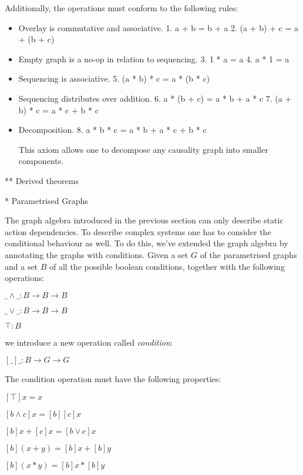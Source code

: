 \documentclass[conference]{IEEEtran}
\begin{document}
Additionally, the operations must conform to the following rules:

\begin{itemize}
\item{Overlay is commutative and associative.
1. a + b = b + a
2. (a + b) + c = a + (b + c)
}

\item{Empty graph is a no-op in relation to sequencing.
3. 1 * a = a
4. a * 1 = a}

\item{Sequencing is associative.
5. (a * b) * c = a * (b * c)}

\item{Sequencing distributes over addition.
6. a * (b + c) = a * b + a * c
7. (a + b) * c = a * c + b * c}

\item{Decomposition.
8. a * b * c = a * b + a * c + b * c

This axiom allows one to decompose any causality graph into smaller components.}

\end{itemize}

** Derived theorems


* Parametrised Graphs

The graph algebra introduced in the previous section can only describe static action dependencies.
To describe complex systems one has to consider the conditional behaviour as well.
To do this, we've extended the graph algebra by annotating the graphs with conditions.
Given a set $G$ of the parametrised graphs and a set $B$ of all the possible boolean conditions, together with the following operations:

$\_\wedge\_ : B \rightarrow B \rightarrow B$

$\_\vee\_ : B \rightarrow B \rightarrow B$

$\top : B$

we introduce a new operation called \emph{condition}:

$[\_]\_ : B \rightarrow G \rightarrow G$

The condition operation must have the following properties:

$[ ⊤ ] x = x$

$[ b ∧ c ] x = [ b ] [ c ] x$

$[ b ] x + [ c ] x = [ b ∨ c ] x$

$[ b ] (x + y) = [ b ] x + [ b ] y$

$[ b ] (x * y) = [ b ] x * [ b ] y$
\end{document}
